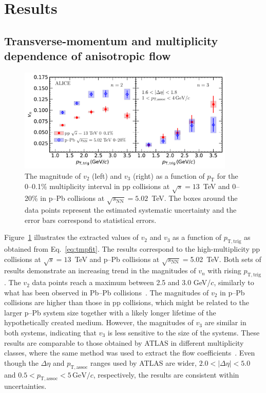 
\section {Results}
\label{sec:results}
\subsection{Transverse-momentum and multiplicity dependence of anisotropic flow}

\begin{figure}[!b]
	\centering
	\hspace{-4.5em}\includegraphics[width=0.92\textwidth]{figures/FIG4_vn_pppPb.pdf} %
	\caption{The magnitude of $v_2$ (left) and $v_3$ (right) as a function of $p_\mathrm{T}$ for the 0--0.1\% multiplicity interval in pp collisions at $\sqrt{s}=13$~TeV and 0--20\% in p--Pb collisions at $\sqrt{s_\mathrm{NN}} = 5.02$~TeV. The boxes around the data points represent the estimated systematic uncertainty and the error bars correspond to statistical errors.}
	\label{fig:vn}
\end{figure}
Figure~\ref{fig:vn} illustrates the extracted values of $v_2$ and $v_3$ as a function of $p_{\mathrm{T,trig}}$ as obtained from Eq.~\eqref{eq:tmpfit}. The results correspond to the high-multiplicity pp collisions at $\sqrt{s}=13$~TeV and p--Pb collisions at $\sqrt{s_\mathrm{NN}}=$5.02~TeV. Both sets of results demonstrate an increasing trend in the magnitudes of $v_n$ with rising $p_{\mathrm{T,trig}}$. The $v_2$ data points reach a maximum between 2.5 and 3.0 GeV/$c$, similarly to what has been observed in Pb--Pb collisions~\cite{Abelev:2012di, ALICE:2018yph}.
The magnitudes of $v_2$ in p--Pb collisions are higher than those in pp collisions, which might be related to the larger p--Pb system size together with a likely longer lifetime of the hypothetically created medium.
However, the magnitudes of $v_3$ are similar in both systems, indicating that $v_3$ is less sensitive to the size of the systems.
These results are comparable to those obtained by ATLAS in different multiplicity classes, where the same method was used to extract the flow coefficients~\cite{ATLAS:2016yzd}. Even though the $\Delta\eta$ and $p_{\mathrm{T,assoc}}$ ranges used by ATLAS are wider, $2.0<|\Delta\eta|<5.0$ and $0.5<p_{\mathrm{T,assoc}}<5\,\mathrm{GeV}/c$, respectively, the results are consistent within uncertainties.


